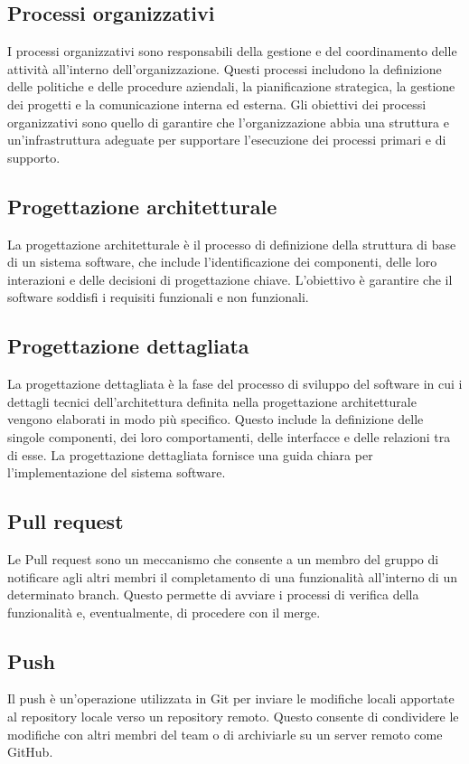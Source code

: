 \subsection*{Processi organizzativi} 
I processi organizzativi sono responsabili della gestione e del coordinamento delle attività all'interno dell'organizzazione. Questi processi includono la definizione delle politiche e delle procedure aziendali, la pianificazione strategica, la gestione dei progetti e la comunicazione interna ed esterna. Gli obiettivi dei processi organizzativi sono quello di garantire che l'organizzazione abbia una struttura e un'infrastruttura adeguate per supportare l'esecuzione dei processi primari e di supporto.
\subsection*{Progettazione architetturale} 
La progettazione architetturale è il processo di definizione della struttura di base di un sistema software, che include l'identificazione dei componenti, delle loro interazioni e delle decisioni di progettazione chiave. L'obiettivo è garantire che il software soddisfi i requisiti funzionali e non funzionali. 
\subsection*{Progettazione dettagliata} 
La progettazione dettagliata è la fase del processo di sviluppo del software in cui i dettagli tecnici dell'architettura definita nella progettazione architetturale vengono elaborati in modo più specifico. Questo include la definizione delle singole componenti, dei loro comportamenti, delle interfacce e delle relazioni tra di esse. La progettazione dettagliata fornisce una guida chiara per l'implementazione del sistema software. 
\subsection*{Pull request} 
Le Pull request sono un meccanismo che consente a un membro del gruppo di notificare agli altri membri il completamento di una funzionalità all'interno di un determinato branch. Questo permette di avviare i processi di verifica della funzionalità e, eventualmente, di procedere con il merge.
\subsection*{Push} 
Il push è un'operazione utilizzata in Git per inviare le modifiche locali apportate al repository locale verso un repository remoto. Questo consente di condividere le modifiche con altri membri del team o di archiviarle su un server remoto come GitHub. 
